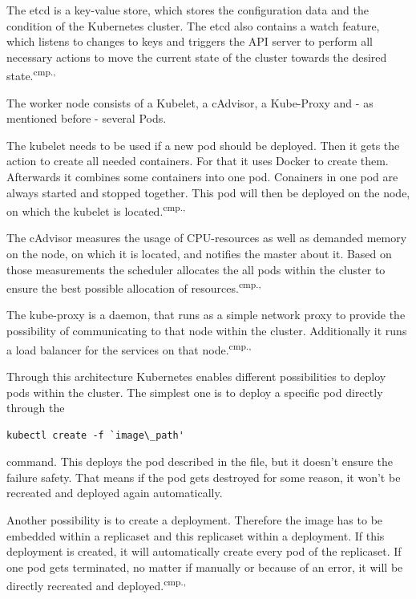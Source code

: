 The etcd is a key-value store, which stores the configuration data and the condition of the Kubernetes cluster. The etcd also contains a watch feature, which listens to changes to keys and triggers the API server to perform all necessary actions to move the current state of the cluster towards the desired state.\textsuperscript{cmp.\cite{13}, \cite{16}}

The worker node consists of a Kubelet, a cAdvisor, a Kube-Proxy and - as mentioned before - several Pods. 

The kubelet needs to be used if a new pod should be deployed. Then it gets the action to create all needed containers. For that it uses Docker to create them. Afterwards it combines some containers into one pod. Conainers in one pod are always started and stopped together. This pod will then be deployed on the node, on which the kubelet is located.\textsuperscript{cmp.\cite{13}, \cite{16}}

The cAdvisor measures the usage of CPU-resources as well as demanded memory on the node, on which it is located, and notifies the master about it. Based on those measurements the scheduler allocates the all pods within the cluster to ensure the best possible allocation of resources.\textsuperscript{cmp.\cite{13}, \cite{16}}

The kube-proxy is a daemon, that runs as a simple network proxy to provide the possibility of communicating to that node within the cluster. Additionally it runs a load balancer for the services on that node.\textsuperscript{cmp.\cite{13}, \cite{16}}

Through this architecture Kubernetes enables different possibilities to deploy pods within the cluster. The simplest one is to deploy a specific pod directly through the 
\begin{lstlisting}[caption={Create Kubernetes pod},captionpos=b]
kubectl create -f `image\_path'
\end{lstlisting}
command. This deploys the pod described in the file, but it doesn't ensure the failure safety. That means if the pod gets destroyed for some reason, it won't be recreated and deployed again automatically. 


Another possibility is to create a deployment. Therefore the image has to be embedded within a replicaset and this replicaset within a deployment. If this deployment is created, it will automatically create every pod of the replicaset. If one pod gets terminated, no matter if manually or because of an error, it will be directly recreated and deployed.\textsuperscript{cmp.\cite{13}, \cite{18}}

